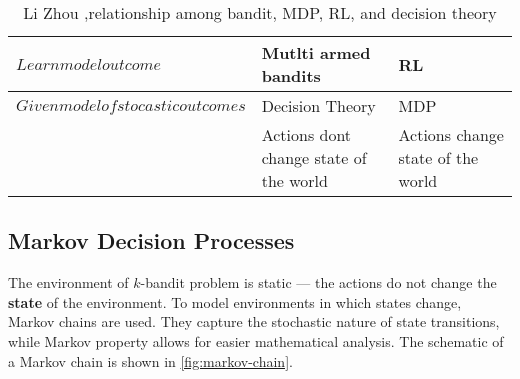 


\begin{table}[H]
\caption{Li Zhou ,relationship among bandit, MDP, RL, and decision theory}
\begin{tabular} {l|l|l}\hline\hline
$Learn model out come$  &  Mutlti armed bandits  &   RL \\ \hline
$Given model of stocastic out comes $ &  Decision Theory & MDP  \\ \hline\hline
$    $ &  Actions dont  
change state of the world & Actions change 
state of the world  \\ \hline\hline
\end{tabular}
\end{table}

 
\subsection{Markov Decision Processes}
The environment of $ k  $-bandit problem is static --- 
the actions do not change the \textbf{state} of the environment.
To model environments in which states change, Markov chains are used.
They capture the stochastic nature of state transitions, while Markov property 
allows for easier mathematical analysis.
The schematic of a Markov chain is shown in \ref{fig:markov-chain}.

